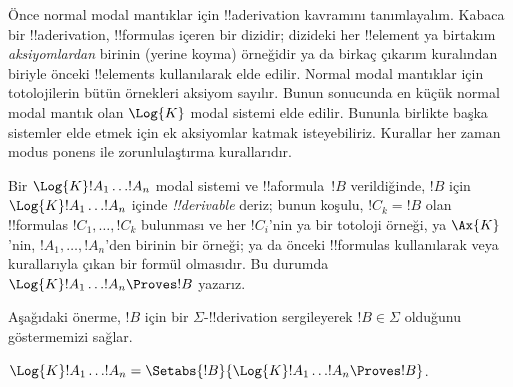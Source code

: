 \documentclass[../../../include/open-logic-section]{subfiles}
\begin{document}


Önce normal modal mantıklar için !!a{derivation} kavramını tanımlayalım.
Kabaca bir !!a{derivation}, !!{formula}s içeren bir dizidir; dizideki her
!!{element} ya birtakım \emph{aksiyomlardan} birinin (yerine koyma) örneğidir
ya da birkaç çıkarım kuralından biriyle önceki !!{element}s kullanılarak elde edilir. Normal modal
mantıklar için totolojilerin bütün örnekleri
 aksiyom sayılır.
Bunun sonucunda en küçük normal modal mantık olan $\Log{K}$ modal sistemi
elde edilir. Bununla birlikte başka sistemler elde etmek için ek aksiyomlar
katmak isteyebiliriz. Kurallar her zaman modus ponens \MP{} ile
zorunlulaştırma \Nec{} kurallarıdır.

\begin{defn}
  Bir $\Log{K}!A_1\dots !A_n$ modal sistemi ve !!a{formula}~$!B$
  verildiğinde, $!B$ için $\Log{K}!A_1\dots !A_n$ içinde
  \emph{!!{derivable}} deriz; bunun
  koşulu, $!C_k=!B$ olan !!{formula}s $!C_1,\dots,!C_k$ bulunması ve her
  $!C_i$'nin ya bir totoloji örneği, ya $\Ax{K}$'nin,
   $!A_1,\dots,!A_n$'den birinin bir
  örneği; ya da önceki !!{formula}s kullanılarak \MP{} veya \Nec{} kurallarıyla çıkan
  bir formül olmasıdır. Bu durumda
  $\Log{K}!A_1\dots !A_n\Proves !B$ yazarız.
\end{defn}

Aşağıdaki önerme, $!B$ için bir $\Sigma$-!!{derivation} sergileyerek
$!B\in\Sigma$ olduğunu göstermemizi sağlar.

\begin{prop}
  $\Log{K}!A_1\dots !A_n=
  \Setabs{!B}{\Log{K}!A_1\dots !A_n\Proves !B}$.
\end{prop}
\end{document}
